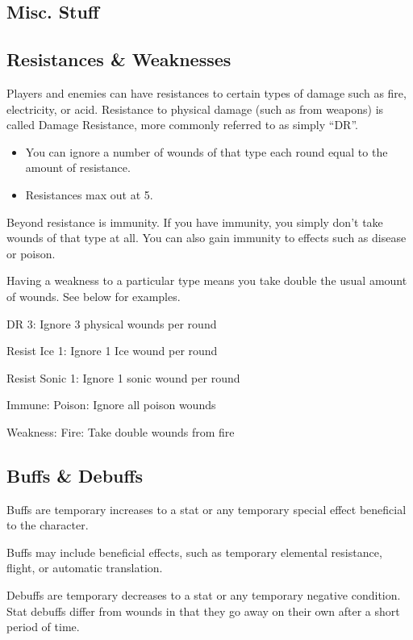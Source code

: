 \begin{multicols}{2}
\section{Misc. Stuff}

\subsection{Resistances \& Weaknesses}
Players and enemies can have resistances to certain types of damage such as fire, electricity, or acid. Resistance to physical damage (such as from weapons) is called Damage Resistance, more commonly referred to as simply “DR”.
\begin{itemize}
\item You can ignore a number of wounds of that type each round equal to the amount of resistance.
\item Resistances max out at 5.
\end{itemize}
Beyond resistance is immunity. If you have immunity, you simply don’t take wounds of that type at all. You can also gain immunity to effects such as disease or poison.

Having a weakness to a particular type means you take double the usual amount of wounds. See below for examples.
\begin{wldescription}
\item [DR 3:] Ignore 3 physical wounds per round
\item [Resist Ice 1:] Ignore 1 Ice wound per round
\item [Resist Sonic 1:] Ignore 1 sonic wound per round
\item [Immune: Poison:] Ignore all poison wounds
\item [Weakness: Fire:] Take double wounds from fire
\end{wldescription}

\subsection{Buffs \& Debuffs}
Buffs are temporary increases to a stat or any temporary special effect beneficial to the character. 

Buffs may include beneficial effects, such as temporary elemental resistance, flight, or automatic translation.

Debuffs are temporary decreases to a stat or any temporary negative condition. Stat debuffs differ from wounds in that they go away on their own after a short period of time.


\end{multicols}
